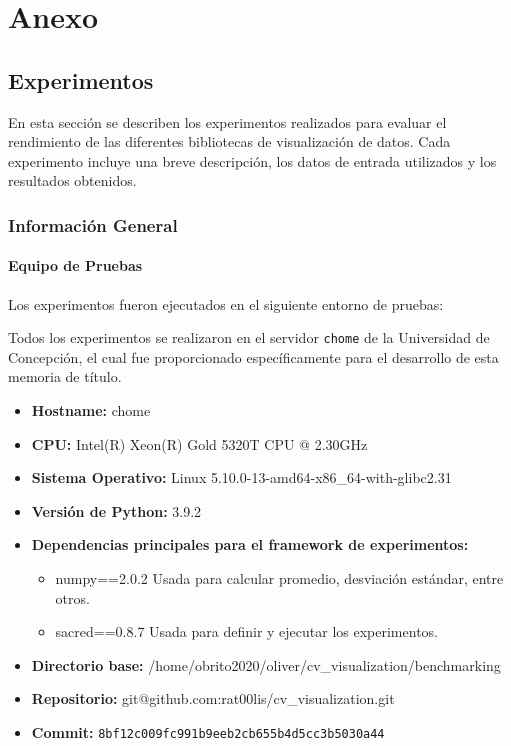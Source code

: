 \section{Anexo}

\subsection{Experimentos}
\label{sec:experimentos}




En esta sección se describen los experimentos realizados para evaluar el rendimiento de las diferentes bibliotecas de visualización de datos. Cada experimento incluye una breve descripción, los datos de entrada utilizados y los resultados obtenidos.

\subsubsection{Información General}
\label{general_info}

\paragraph{Equipo de Pruebas}
Los experimentos fueron ejecutados en el siguiente entorno de pruebas:

Todos los experimentos se realizaron en el servidor \texttt{chome} de la Universidad de Concepción, el cual fue proporcionado específicamente para el desarrollo de esta memoria de título. 

\begin{itemize}
    \item \textbf{Hostname:} chome
    \item \textbf{CPU:} Intel(R) Xeon(R) Gold 5320T CPU @ 2.30GHz
    \item \textbf{Sistema Operativo:} Linux 5.10.0-13-amd64-x86\_64-with-glibc2.31
    \item \textbf{Versión de Python:} 3.9.2
    \item \textbf{Dependencias principales para el framework de experimentos:}
    \begin{itemize}
        \item numpy==2.0.2
            Usada para calcular promedio, desviación estándar, entre otros.
        \item sacred==0.8.7
            Usada para definir y ejecutar los experimentos.
    \end{itemize}
    \item \textbf{Directorio base:} /home/obrito2020/oliver/cv\_visualization/benchmarking
    \item \textbf{Repositorio:} git@github.com:rat00lis/cv\_visualization.git
    \item \textbf{Commit:} \texttt{8bf12c009fc991b9eeb2cb655b4d5cc3b5030a44}
\end{itemize}

